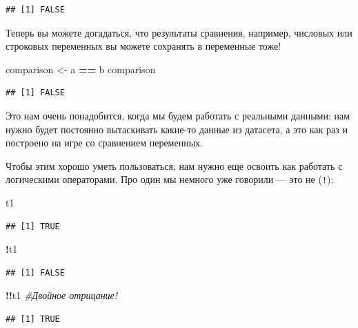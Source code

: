\documentclass[]{book}
\newenvironment{Shaded}{\begin{snugshade}}{\end{snugshade}}
\newcommand{\CommentTok}[1]{\textcolor[rgb]{0.56,0.35,0.01}{\textit{#1}}}
\newcommand{\NormalTok}[1]{#1}
\newcommand{\OperatorTok}[1]{\textcolor[rgb]{0.81,0.36,0.00}{\textbf{#1}}}
\newcommand{\StringTok}[1]{\textcolor[rgb]{0.31,0.60,0.02}{#1}}
\begin{document}
\begin{verbatim}
## [1] FALSE
\end{verbatim}

Теперь вы можете догадаться, что результаты сравнения, например, числовых или строковых переменных вы можете сохранять в переменные тоже!

\begin{Shaded}
\begin{Highlighting}[]
\NormalTok{comparison <-}\StringTok{ }\NormalTok{a }\OperatorTok{==}\StringTok{ }\NormalTok{b}
\NormalTok{comparison}
\end{Highlighting}
\end{Shaded}

\begin{verbatim}
## [1] FALSE
\end{verbatim}

Это нам очень понадобится, когда мы будем работать с реальными данными: нам нужно будет постоянно вытаскивать какие-то данные из датасета, а это как раз и построено на игре со сравнением переменных.

Чтобы этим хорошо уметь пользоваться, нам нужно еще освоить как работать с логическими операторами. Про один мы немного уже говорили --- это не (\texttt{!}):

\begin{Shaded}
\begin{Highlighting}[]
\NormalTok{t1}
\end{Highlighting}
\end{Shaded}

\begin{verbatim}
## [1] TRUE
\end{verbatim}

\begin{Shaded}
\begin{Highlighting}[]
\OperatorTok{!}\NormalTok{t1}
\end{Highlighting}
\end{Shaded}

\begin{verbatim}
## [1] FALSE
\end{verbatim}

\begin{Shaded}
\begin{Highlighting}[]
\OperatorTok{!!}\NormalTok{t1 }\CommentTok{#Двойное отрицание!}
\end{Highlighting}
\end{Shaded}

\begin{verbatim}
## [1] TRUE
\end{verbatim}
\end{document}
